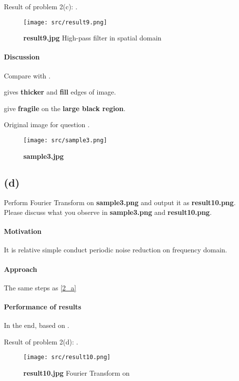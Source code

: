 Result of problem 2(c): .
\begin{figure}
    \centering
    \texttt{[image: src/result9.png]}
    \caption{\textbf{result9.jpg} High-pass filter in spatial domain}
    \label{result9}
\end{figure}

\paragraph{Discussion}
Compare  with .

 gives \textbf{thicker} and \textbf{fill} edges of image.

 give \textbf{fragile} on the \textbf{large black region}.

Original image  for question  .
\begin{figure}
    \centering
    \texttt{[image: src/sample3.png]}
    \caption{\textbf{sample3.jpg}}
    \label{sample3}
\end{figure}

\subsection{(d)}\label{2_d}
Perform Fourier Transform on \textbf{sample3.png} and output it as \textbf{result10.png}. Please discuss what you observe in \textbf{sample3.png} and \textbf{result10.png}.

\paragraph{Motivation}
It is relative simple conduct periodic noise reduction on frequency domain.

\paragraph{Approach}
The same steps as \ref{2_a}

\paragraph{Performance of results}
In the end, based on .

Result of problem 2(d): .
\begin{figure}
    \centering
    \texttt{[image: src/result10.png]}
    \caption{\textbf{result10.jpg} Fourier Transform on }
    \label{result10}
\end{figure}

